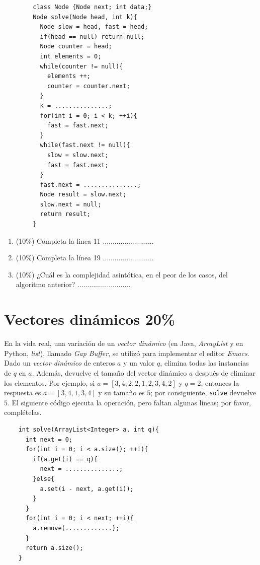 \documentclass[10 pt]{article}
\begin{document}
\begin{multicols}{2}
		 {\small
		\begin{lstlisting}
		class Node {Node next; int data;}
		Node solve(Node head, int k){
		  Node slow = head, fast = head;
		  if(head == null) return null;
		  Node counter = head;
		  int elements = 0;
		  while(counter != null){
		    elements ++;
		    counter = counter.next;
		  }
		  k = ...............;
		  for(int i = 0; i < k; ++i){
		    fast = fast.next;
		  }
		  while(fast.next != null){
		    slow = slow.next;
		    fast = fast.next;
		  }
		  fast.next = ...............;
		  Node result = slow.next;
		  slow.next = null;
		  return result;
		}
		\end{lstlisting}
		}
		\begin{enumerate}[label=\Alph*]
			\item (10\%) Completa la linea 11 ..........................
			\item (10\%) Completa la línea 19
			..........................
			\item (10\%) ¿Cuál es la complejidad asintótica, en el peor de los casos, del algoritmo anterior?
			...........................
		\end{enumerate}


		\section{Vectores dinámicos 20\%}
		En la vida real, una variación de un \textit{vector dinámico} (en Java, \textit{ArrayList} y en Python, \textit{list}), llamado \textit{Gap Buffer}, se utilizó para implementar el editor \textit{Emacs}. 
		Dado un \textit{vector dinámico} de enteros $a$ y un valor $q$, elimina todas las instancias de $q$ en $a$. Además, devuelve el tamaño del vector dinámico $a$ después de eliminar los elementos. Por ejemplo, si $a = [3, 4, 2, 2, 1, 2, 3, 4, 2]$ y $q = 2$, entonces la respuesta es $a = [3, 4, 1, 3, 4]$ y su tamaño es $5$; por consiguiente, \texttt{solve} devuelve $5$. El siguiente código ejecuta la operación, pero faltan algunas líneas; por favor, complételas.\\
		
		 {\small
		\begin{lstlisting}
	int solve(ArrayList<Integer> a, int q){
	  int next = 0;
	  for(int i = 0; i < a.size(); ++i){
	    if(a.get(i) == q){
	      next = ...............;
	    }else{
	      a.set(i - next, a.get(i));
	    }
	  }
	  for(int i = 0; i < next; ++i){
	    a.remove(.............);
	  }
	  return a.size();
	}
		\end{lstlisting}
		}


\end{multicols}
\end{document}
